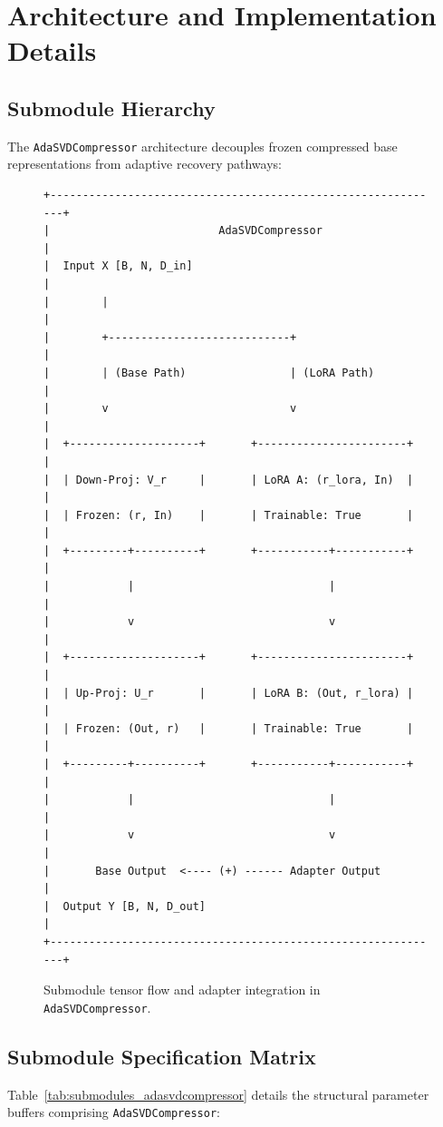 \documentclass{article}
\begin{document}
\section{Architecture and Implementation Details}

\subsection{Submodule Hierarchy}
The \texttt{AdaSVDCompressor} architecture decouples frozen compressed base representations from adaptive recovery pathways:

\begin{figure}[H]
\centering
\begin{verbatim}
+-------------------------------------------------------------+
|                          AdaSVDCompressor                   |
|  Input X [B, N, D_in]                                       |
|        |                                                    |
|        +----------------------------+                       |
|        | (Base Path)                | (LoRA Path)           |
|        v                            v                       |
|  +--------------------+       +-----------------------+     |
|  | Down-Proj: V_r     |       | LoRA A: (r_lora, In)  |     |
|  | Frozen: (r, In)    |       | Trainable: True       |     |
|  +---------+----------+       +-----------+-----------+     |
|            |                              |                 |
|            v                              v                 |
|  +--------------------+       +-----------------------+     |
|  | Up-Proj: U_r       |       | LoRA B: (Out, r_lora) |     |
|  | Frozen: (Out, r)   |       | Trainable: True       |     |
|  +---------+----------+       +-----------+-----------+     |
|            |                              |                 |
|            v                              v                 |
|       Base Output  <---- (+) ------ Adapter Output          |
|  Output Y [B, N, D_out]                                     |
+-------------------------------------------------------------+
\end{verbatim}
\caption{Submodule tensor flow and adapter integration in \texttt{AdaSVDCompressor}.}
\end{figure}

\subsection{Submodule Specification Matrix}
Table~\ref{tab:submodules_adasvdcompressor} details the structural parameter buffers comprising \texttt{AdaSVDCompressor}:
\end{document}
